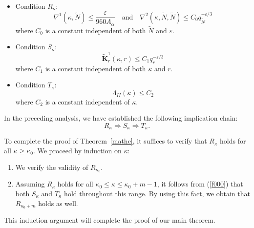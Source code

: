 \documentclass{amsart}
\newcounter{item}[section]
\theoremstyle{definition}
\begin{document}
\begin{itemize}
	\item Condition $R_{\kappa}$:
	\begin{equation}\label{eq:Qk}
		\nabla^1(\kappa,\tilde{N}) \leq \frac{\varepsilon}{960A_\alpha} \quad \text{and} \quad \nabla^2(\kappa,\tilde{N},\tilde{N}) \leq C_0 q_{\tilde{N}}^{-\varepsilon/3}
	\end{equation}
	where $C_0$ is a constant independent of both $\tilde{N}$ and $\varepsilon$.
	\item Condition $S_{\kappa}$:
	\begin{equation}\label{eq:Rk}
		\widetilde{\mathbf{K}}_r^1(\kappa,r) \leq C_1 q_r^{-\varepsilon/3}
	\end{equation}
	where $C_1$ is a constant independent of both $\kappa$ and $r$.
	
	\item Condition $T_{\kappa}$:
	\begin{equation}\label{eq:Tk}
		\Lambda_{II}(\kappa) \leq C_2
	\end{equation}
	where $C_2$ is a constant independent of $\kappa$.
\end{itemize}

In the preceding analysis, we have established the following implication chain:
\begin{equation}\label{f000}
	R_{\kappa} \Rightarrow S_{\kappa} \Rightarrow T_{\kappa}.
\end{equation}

To complete the proof of Theorem~\ref{mathe}, it suffices to verify that $R_{\kappa}$ holds for all $\kappa \geq \kappa_0$. We proceed by induction on $\kappa$:

\begin{enumerate}
	\item  We verify the validity of $R_{\kappa_0}$.
	
	\item  Assuming $R_{\kappa}$ holds for all $\kappa_0 \leq \kappa \leq \kappa_0 + m - 1$, it follows from (\ref{f000}) that both $S_{\kappa}$ and $T_{\kappa}$ hold throughout this range. By using this fact, we obtain that $R_{\kappa_0 + m}$ holds as well.
\end{enumerate}
This induction argument will  complete the proof of our main theorem.

\vspace{1em}
\end{document}
